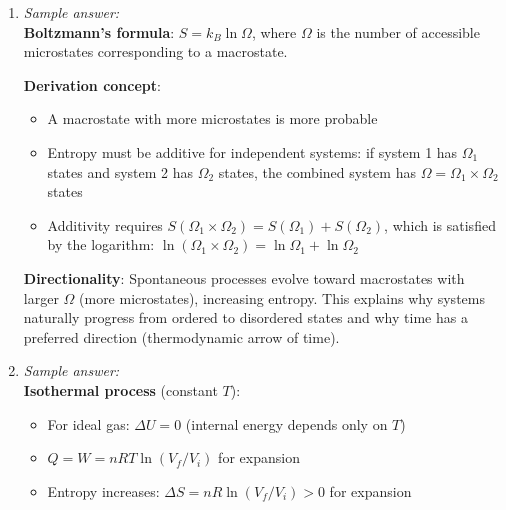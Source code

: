 \documentclass[11pt]{article}
\begin{document}
\begin{enumerate}[label=\textbf{\arabic*.}]
  \textbf{Second Law}: In an isolated system, entropy never decreases: $\Delta S \geq 0$. This gives 
  directionality to time and explains why certain processes are irreversible. It limits the efficiency 
  of heat engines and prohibits perpetual motion machines of the second kind.

  \textbf{Third Law}: As temperature approaches absolute zero, the entropy of a perfect crystal approaches 
  zero: $S \to 0$ as $T \to 0$. This provides an absolute scale for entropy and implies that absolute 
  zero is unattainable.

  Together, these laws constrain energy conversion, establish equilibrium conditions, and explain 
  irreversibility in nature.

  \item \emph{Sample answer:}\\
  \textbf{Boltzmann's formula}: $S = k_B \ln \Omega$, where $\Omega$ is the number of accessible 
  microstates corresponding to a macrostate.

  \textbf{Derivation concept}:
  \begin{itemize}
    \item A macrostate with more microstates is more probable
    \item Entropy must be additive for independent systems: if system 1 has $\Omega_1$ states and 
    system 2 has $\Omega_2$ states, the combined system has $\Omega = \Omega_1 \times \Omega_2$ states
    \item Additivity requires $S(\Omega_1 \times \Omega_2) = S(\Omega_1) + S(\Omega_2)$, which is 
    satisfied by the logarithm: $\ln(\Omega_1 \times \Omega_2) = \ln \Omega_1 + \ln \Omega_2$
  \end{itemize}

  \textbf{Directionality}: Spontaneous processes evolve toward macrostates with larger $\Omega$ 
  (more microstates), increasing entropy. This explains why systems naturally progress from ordered 
  to disordered states and why time has a preferred direction (thermodynamic arrow of time).

  \item \emph{Sample answer:}\\
  \textbf{Isothermal process} (constant $T$):
  \begin{itemize}
    \item For ideal gas: $\Delta U = 0$ (internal energy depends only on $T$)
    \item $Q = W = nRT \ln(V_f/V_i)$ for expansion
    \item Entropy increases: $\Delta S = nR \ln(V_f/V_i) > 0$ for expansion
  \end{itemize}


\end{enumerate}
\end{document}
